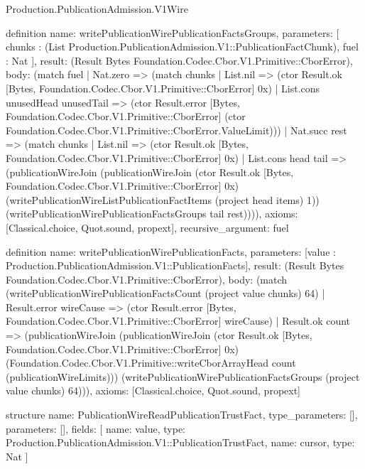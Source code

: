 \begin{lexlean}{Production.PublicationAdmission.V1Wire}
\begin{semanticmodule}
definition{
  name: writePublicationWirePublicationFactsGroups,
  parameters: [
    chunks : (List Production.PublicationAdmission.V1::PublicationFactChunk),
    fuel : Nat
  ],
  result: (Result Bytes Foundation.Codec.Cbor.V1.Primitive::CborError),
  body: (match fuel
    | Nat.zero => (match chunks
      | List.nil => (ctor Result.ok [Bytes, Foundation.Codec.Cbor.V1.Primitive::CborError] 0x)
      | List.cons unusedHead unusedTail => (ctor Result.error [Bytes, Foundation.Codec.Cbor.V1.Primitive::CborError] (ctor Foundation.Codec.Cbor.V1.Primitive::CborError.ValueLimit)))
    | Nat.succ rest => (match chunks
      | List.nil => (ctor Result.ok [Bytes, Foundation.Codec.Cbor.V1.Primitive::CborError] 0x)
      | List.cons head tail => (publicationWireJoin (publicationWireJoin (ctor Result.ok [Bytes, Foundation.Codec.Cbor.V1.Primitive::CborError] 0x) (writePublicationWireListPublicationFactItems (project head items) 1)) (writePublicationWirePublicationFactsGroups tail rest)))),
  axioms: [Classical.choice, Quot.sound, propext],
  recursive_argument: fuel
}

definition{
  name: writePublicationWirePublicationFacts,
  parameters: [value : Production.PublicationAdmission.V1::PublicationFacts],
  result: (Result Bytes Foundation.Codec.Cbor.V1.Primitive::CborError),
  body: (match (writePublicationWirePublicationFactsCount (project value chunks) 64)
    | Result.error wireCause => (ctor Result.error [Bytes, Foundation.Codec.Cbor.V1.Primitive::CborError] wireCause)
    | Result.ok count => (publicationWireJoin (publicationWireJoin (ctor Result.ok [Bytes, Foundation.Codec.Cbor.V1.Primitive::CborError] 0x) (Foundation.Codec.Cbor.V1.Primitive::writeCborArrayHead count (publicationWireLimits))) (writePublicationWirePublicationFactsGroups (project value chunks) 64))),
  axioms: [Classical.choice, Quot.sound, propext]
}

structure{
  name: PublicationWireReadPublicationTrustFact,
  type_parameters: [],
  parameters: [],
  fields: [
    {name: value, type: Production.PublicationAdmission.V1::PublicationTrustFact},
    {name: cursor, type: Nat}
  ]
}


\end{semanticmodule}
\end{lexlean}
